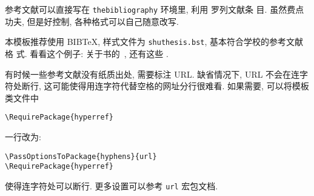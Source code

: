 \label{cha:bib}
参考文献可以直接写在 \texttt{thebibliography} 环境里, 利用  罗列文献条
目. 虽然费点功夫, 但是好控制, 各种格式可以自己随意改写.

本模板推荐使用 BIB\TeX, 样式文件为 \texttt{shuthesis.bst}, 基本符合学校的参考文献格
式. 看看这个例子: 关于书的~\cite{tex1989,algebra2000}, 还有这些 \cite{nikiforov2014,
BuFanZhou2016:Z-eigenvalues,HuQiShao2013:Cored-Hypergraphs,KangNikiforov2014:Extremal-Problems,
LinZhou2016:Distance-Spectral,LuMan2016:Small-Spectral-Radius,Nikiforov2017:Symmetric-Spectrum,
Qi2014:H-Plus-Eigenvalues}.

有时候一些参考文献没有纸质出处, 需要标注 URL. 缺省情况下, URL 不会在连字符处断行,
这可能使得用连字符代替空格的网址分行很难看. 如果需要, 可以将模板类文件中
\begin{verbatim}
\RequirePackage{hyperref}
\end{verbatim}
一行改为:
\begin{verbatim}
\PassOptionsToPackage{hyphens}{url}
\RequirePackage{hyperref}
\end{verbatim}
使得连字符处可以断行. 更多设置可以参考 \texttt{url} 宏包文档.
